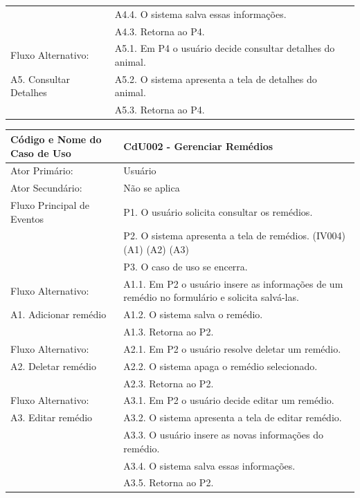 \documentclass[12pt]{article}
\begin{document}
\begin{titlepage}
\begin{center}
\begin{tabular}{ | l |  p{10cm} |}
                               & A4.4. O sistema salva essas informações. \\
			       & A4.3. Retorna ao P4. \\ \hline
    Fluxo Alternativo:         & A5.1. Em P4 o usuário decide consultar detalhes do animal. \\
    A5. Consultar Detalhes     & A5.2. O sistema apresenta a tela de detalhes do animal. \\
			       & A5.3. Retorna ao P4. \\
    \hline
  \end{tabular}
\end{center}


\begin{center}
  \begin{tabular}{ | l |  p{10cm} |}
    \hline
    Código e Nome do Caso de Uso & CdU002 - Gerenciar Remédios \\ \hline
    Ator Primário: & Usuário \\ 
    Ator Secundário: & Não se aplica \\ \hline
    Fluxo Principal de Eventos & P1. O usuário solicita consultar os remédios. \\
			       & P2. O sistema apresenta a tela de remédios. (IV004) (A1) (A2) (A3) \\
                               & P3. O caso de uso se encerra. \\ \hline
    Fluxo Alternativo:         & A1.1. Em P2 o usuário insere as informações de um remédio no formulário e solicita salvá-las. \\
    A1. Adicionar remédio      & A1.2. O sistema salva o remédio. \\ 
			       & A1.3. Retorna ao P2. \\ \hline
    Fluxo Alternativo:         & A2.1. Em P2 o usuário resolve deletar um remédio. \\
    A2. Deletar remédio        & A2.2. O sistema apaga o remédio selecionado. \\
			       & A2.3. Retorna ao P2. \\ \hline
    Fluxo Alternativo:         & A3.1. Em P2 o usuário decide editar um remédio. \\
    A3. Editar remédio         & A3.2. O sistema apresenta a tela de editar remédio. \\
			       & A3.3. O usuário insere as novas informações do remédio. \\
                               & A3.4. O sistema salva essas informações. \\
			       & A3.5. Retorna ao P2. \\
    \hline
  \end{tabular}
\end{center}



\end{titlepage}
\end{document}
